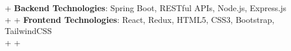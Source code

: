 \documentclass[letterpaper,10pt]{article}                                                                                                                                                                                                                                                                                                                                                                                                                                                                                                                                                                         +
\begin{document}
\begin{itemize}[leftmargin=0.15in, label={}, itemsep=2pt]
{{                                                                                                                                                                                                                                                                                                                                                                                                                                                                                                                                                                                                                   +
  \textbf{Backend Technologies}{: Spring Boot, RESTful APIs, Node.js, Express.js} \\                                                                                                                                                                                                                                                                                                                                                                                                                                                                                                                               +
                                                                                                                                                                                                                                                                                                                                                                                                                                                                                                                                                                                                                   +
  \textbf{Frontend Technologies}{: React, Redux, HTML5, CSS3, Bootstrap, TailwindCSS} \\                                                                                                                                                                                                                                                                                                                                                                                                                                                                                                                           +
                                                                                                                                                                                                                                                                                                                                                                                                                                                                                                                                                                                                                   +
}}
\end{itemize}
\end{document}
